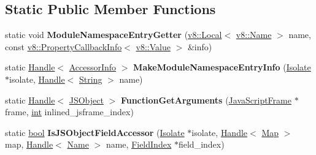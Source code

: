 \subsection*{Static Public Member Functions}
\begin{DoxyCompactItemize}
\item 
\mbox{\label{classv8_1_1internal_1_1Accessors_a5ba1e99de6d9f7b268c386011e8b5080}} 
static void {\bfseries Module\+Namespace\+Entry\+Getter} (\mbox{\hyperlink{classv8_1_1Local}{v8\+::\+Local}}$<$ \mbox{\hyperlink{classv8_1_1Name}{v8\+::\+Name}} $>$ name, const \mbox{\hyperlink{classv8_1_1PropertyCallbackInfo}{v8\+::\+Property\+Callback\+Info}}$<$ \mbox{\hyperlink{classv8_1_1Value}{v8\+::\+Value}} $>$ \&info)
\item 
\mbox{\label{classv8_1_1internal_1_1Accessors_a2ae006cc99158006e23decca582a380b}} 
static \mbox{\hyperlink{classv8_1_1internal_1_1Handle}{Handle}}$<$ \mbox{\hyperlink{classv8_1_1internal_1_1AccessorInfo}{Accessor\+Info}} $>$ {\bfseries Make\+Module\+Namespace\+Entry\+Info} (\mbox{\hyperlink{classv8_1_1internal_1_1Isolate}{Isolate}} $\ast$isolate, \mbox{\hyperlink{classv8_1_1internal_1_1Handle}{Handle}}$<$ \mbox{\hyperlink{classv8_1_1internal_1_1String}{String}} $>$ name)
\item 
\mbox{\label{classv8_1_1internal_1_1Accessors_ac070e74669475cb270aa2c3960e6bdb2}} 
static \mbox{\hyperlink{classv8_1_1internal_1_1Handle}{Handle}}$<$ \mbox{\hyperlink{classv8_1_1internal_1_1JSObject}{J\+S\+Object}} $>$ {\bfseries Function\+Get\+Arguments} (\mbox{\hyperlink{classv8_1_1internal_1_1JavaScriptFrame}{Java\+Script\+Frame}} $\ast$frame, \mbox{\hyperlink{classint}{int}} inlined\+\_\+jsframe\+\_\+index)
\item 
\mbox{\label{classv8_1_1internal_1_1Accessors_a28e31d67545e273fff7ddc98bff73a58}} 
static \mbox{\hyperlink{classbool}{bool}} {\bfseries Is\+J\+S\+Object\+Field\+Accessor} (\mbox{\hyperlink{classv8_1_1internal_1_1Isolate}{Isolate}} $\ast$isolate, \mbox{\hyperlink{classv8_1_1internal_1_1Handle}{Handle}}$<$ \mbox{\hyperlink{classv8_1_1internal_1_1Map}{Map}} $>$ map, \mbox{\hyperlink{classv8_1_1internal_1_1Handle}{Handle}}$<$ \mbox{\hyperlink{classv8_1_1internal_1_1Name}{Name}} $>$ name, \mbox{\hyperlink{classv8_1_1internal_1_1FieldIndex}{Field\+Index}} $\ast$field\+\_\+index)

\end{DoxyCompactItemize}
